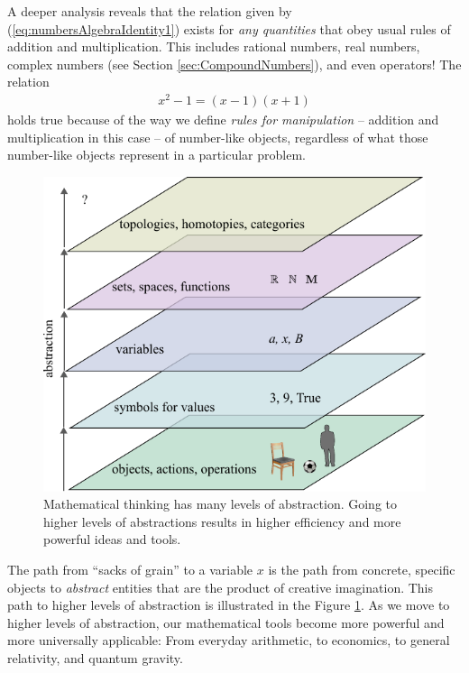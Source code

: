 A deeper analysis reveals that the relation given by
(\ref{eq:numbersAlgebraIdentity1}) exists for \emph{any quantities}
that obey usual rules of addition and multiplication. This includes
rational numbers, real numbers, complex numbers (see Section
\ref{sec:CompoundNumbers}), and even operators! The relation
\begin{align}
  x^2-1=(x-1)(x+1)
\end{align}
 holds true because of the way we define \emph{rules for manipulation} --
 addition and multiplication in this case -- of
number-like objects, regardless of what those number-like objects
represent in a particular problem.
\begin{figure}[htbp]
  \centering
  \includegraphics[scale=1.0]{numbersAbstractionLevels}
  \caption{Mathematical thinking has many levels of abstraction. Going
    to higher levels of abstractions results in higher efficiency and
    more powerful ideas and tools.}
  \label{fig:numbersAbstractionLevels}
\end{figure}

The path from ``sacks of grain'' to a variable $x$ is the path from concrete,
specific objects to \emph{abstract} entities that are the product of
creative imagination. This path to higher levels of abstraction is
illustrated in the Figure \ref{fig:numbersAbstractionLevels}. As we
move to higher levels of abstraction, our mathematical tools become
more powerful and more universally applicable: From everyday
arithmetic, to economics, to general relativity, and quantum gravity.

